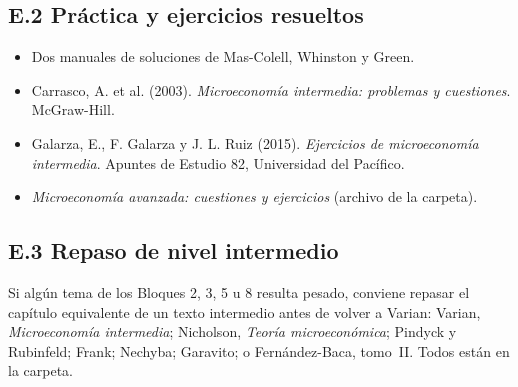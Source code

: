 \documentclass[11pt,a4paper]{article}
\begin{document}
\subsection*{E.2 Práctica y ejercicios resueltos}
{\small
\begin{itemize}[leftmargin=1.4em,itemsep=2pt]
  \item Dos manuales de soluciones de Mas-Colell, Whinston y Green.
  \item Carrasco, A. et al. (2003). \emph{Microeconomía intermedia: problemas y
        cuestiones}. McGraw-Hill.
  \item Galarza, E., F. Galarza y J. L. Ruiz (2015). \emph{Ejercicios de
        microeconomía intermedia}. Apuntes de Estudio 82, Universidad del
        Pacífico.
  \item \emph{Microeconomía avanzada: cuestiones y ejercicios} (archivo de la
        carpeta).
\end{itemize}
}

\subsection*{E.3 Repaso de nivel intermedio}
{\small
Si algún tema de los Bloques 2, 3, 5 u 8 resulta pesado, conviene repasar el
capítulo equivalente de un texto intermedio antes de volver a Varian:
Varian, \emph{Microeconomía intermedia}; Nicholson, \emph{Teoría
microeconómica}; Pindyck y Rubinfeld; Frank; Nechyba; Garavito; o
Fernández-Baca, tomo~II. Todos están en la carpeta.
}
\end{document}
